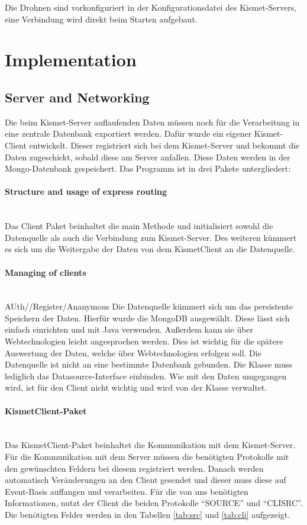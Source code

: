 \documentclass[a4paper]{spie}  %
\begin{document}
Die Drohnen sind vorkonfiguriert in der Konfigurationsdatei des Kismet-Servers, eine Verbindung wird direkt beim Starten aufgebaut.
\section{Implementation}
\subsection{Server and Networking}
Die beim Kismet-Server auflaufenden Daten müssen noch für die Verarbeitung in eine zentrale Datenbank exportiert werden. Dafür wurde ein eigener Kismet-Client entwickelt. Dieser registriert sich bei dem Kismet-Server und bekommt die Daten zugeschickt, sobald diese am Server anfallen. Diese Daten werden in der Mongo-Datenbank gespeichert. Das Programm ist in drei Pakete untergliedert:

\paragraph{Structure and usage of express routing}\mbox{}\\
Das Client Paket beinhaltet die main Methode und initialisiert sowohl die Datenquelle als auch die Verbindung zum Kismet-Server. Des weiteren kümmert es sich um die Weitergabe der Daten von dem KismetClient an die Datenquelle.

\paragraph{Managing of clients}\mbox{}\\
AUth//Register/Ananymous
Die Datenquelle kümmert sich um das persistente Speichern der Daten. Hierfür wurde die MongoDB ausgewählt. Diese lässt sich einfach einrichten und mit Java verwenden. Außerdem kann sie über Webtechnologien leicht angesprochen werden. Dies ist wichtig für die  spätere Auswertung der Daten, welche über Webtechnologien erfolgen soll. Die Datenquelle ist nicht an eine bestimmte Datenbank gebunden. Die Klasse muss lediglich das Datasource-Interface einbinden. Wie mit den Daten umgegangen wird, ist für den Client nicht wichtig und wird von der Klasse verwaltet. 

\paragraph{KismetClient-Paket}\mbox{}\\
Das KismetClient-Paket beinhaltet die Kommunikation mit dem Kismet-Server. Für die Kommunikation mit dem Server müssen die benötigten Protokolle mit den gewünschten Feldern bei diesem registriert werden. Danach werden automatisch Veränderungen an den Client gesendet und dieser muss diese auf Event-Basis auffangen und verarbeiten. Für die von uns benötigten Informationen, nutzt der Client die beiden Protokolle \enquote{SOURCE} und \enquote{CLISRC}. Die benötigten Felder werden in den Tabellen \ref{tab:src} und \ref{tab:cli} aufgezeigt.
\end{document}
